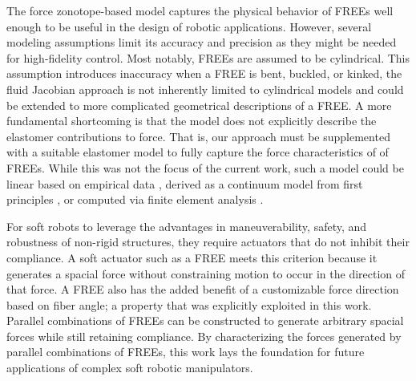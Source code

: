 The force zonotope-based model captures the physical behavior of FREEs well enough to be useful in the design of robotic applications.
However, several modeling assumptions limit its accuracy and precision as they might be needed for high-fidelity control. 
Most notably, FREEs are assumed to be cylindrical. 
This assumption introduces inaccuracy when a FREE is bent, buckled, or kinked,  
the fluid Jacobian approach is not inherently limited to cylindrical models and could be extended to more complicated geometrical descriptions of a FREE.
A more fundamental shortcoming is that the model does not explicitly describe the elastomer contributions to force.
That is, our approach must be supplemented with a suitable elastomer model to fully capture the force characteristics of of FREEs.
While this was not the focus of the current work, such a model could be linear based on empirical data \cite{bruder2017model}, derived as a continuum model from first principles \cite{sedal2017constitutive}, or computed via finite element analysis \cite{connolly2015mechanical}.


For soft robots to leverage the advantages in maneuverability, safety, and robustness of non-rigid structures, they require actuators that do not inhibit their compliance. 
A soft actuator such as a FREE meets this criterion because it generates a spacial force without constraining motion to occur in the direction of that force. 
A FREE also has the added benefit of a customizable force direction based on fiber angle; a property that was explicitly exploited in this work.
Parallel combinations of FREEs can be constructed to generate arbitrary spacial forces while still retaining compliance. 
By characterizing the forces generated by parallel combinations of FREEs, this work lays the foundation for future applications of complex soft robotic manipulators.